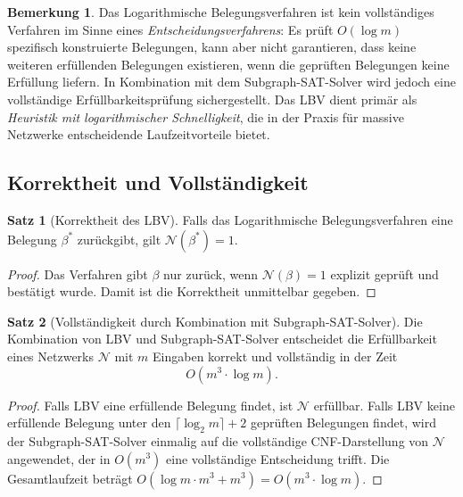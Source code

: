 ﻿\documentclass[a4paper,12pt]{article}
\theoremstyle{definition}
\newtheorem{satz}{Satz}
\newtheorem{bemerkung}{Bemerkung}
\begin{document}
\begin{bemerkung}
	Das Logarithmische Belegungsverfahren ist kein vollständiges Verfahren im Sinne eines
	\emph{Entscheidungsverfahrens}: Es prüft $O(\log m)$ spezifisch konstruierte Belegungen,
	kann aber nicht garantieren, dass keine weiteren erfüllenden Belegungen existieren, wenn
	die geprüften Belegungen keine Erfüllung liefern. In Kombination mit dem Subgraph-SAT-Solver
	wird jedoch eine vollständige Erfüllbarkeitsprüfung sichergestellt. Das LBV dient primär
	als \emph{Heuristik mit logarithmischer Schnelligkeit}, die in der Praxis für massive
	Netzwerke entscheidende Laufzeitvorteile bietet.
\end{bemerkung}

\subsection{Korrektheit und Vollständigkeit}

\begin{satz}[Korrektheit des LBV]
	Falls das Logarithmische Belegungsverfahren eine Belegung $\beta^*$ zurückgibt, gilt
	$\mathcal{N}(\beta^*) = 1$.
\end{satz}

\begin{proof}
	Das Verfahren gibt $\beta$ nur zurück, wenn $\mathcal{N}(\beta) = 1$ explizit geprüft
	und bestätigt wurde. Damit ist die Korrektheit unmittelbar gegeben.
\end{proof}

\begin{satz}[Vollständigkeit durch Kombination mit Subgraph-SAT-Solver]
	Die Kombination von LBV und Subgraph-SAT-Solver entscheidet die Erfüllbarkeit eines
	Netzwerks $\mathcal{N}$ mit $m$ Eingaben korrekt und vollständig in der Zeit
	\[
	O\!\left(m^3 \cdot \log m\right).
	\]
\end{satz}

\begin{proof}
	Falls LBV eine erfüllende Belegung findet, ist $\mathcal{N}$ erfüllbar. Falls LBV keine
	erfüllende Belegung unter den $\lceil \log_2 m \rceil + 2$ geprüften Belegungen findet,
	wird der Subgraph-SAT-Solver einmalig auf die vollständige CNF-Darstellung von $\mathcal{N}$
	angewendet, der in $O(m^3)$ eine vollständige Entscheidung trifft. Die Gesamtlaufzeit
	beträgt $O(\log m \cdot m^3 + m^3) = O(m^3 \cdot \log m)$.
\end{proof}

\end{document}
